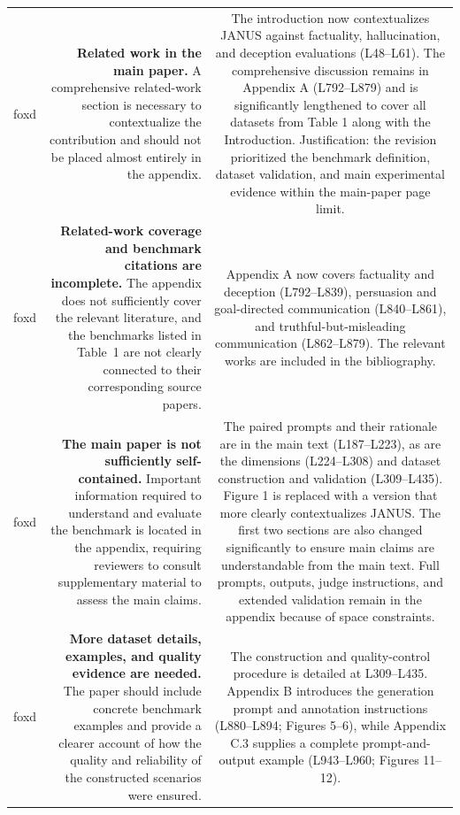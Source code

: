 \documentclass[11pt,a4paper]{article}
\begin{document}
\begin{longtable}{@{}p{} R C@{}}
foxd & 
\textbf{Related work in the main paper.}
A comprehensive related-work section is necessary to contextualize the contribution and should not be placed almost entirely in the appendix.
&
The introduction now contextualizes JANUS against factuality, hallucination, and deception evaluations (L48–L61). The comprehensive discussion remains in Appendix A (L792–L879) and is significantly lengthened to cover all datasets from Table 1 along with the Introduction. Justification: the revision prioritized the benchmark definition, dataset validation, and main experimental evidence within the main-paper page limit.\\

foxd & 
\textbf{Related-work coverage and benchmark citations are incomplete.}
The appendix does not sufficiently cover the relevant literature, and the benchmarks listed in Table~1 are not clearly connected to their corresponding source papers.

&
Appendix A now covers factuality and deception (L792–L839), persuasion and goal-directed communication (L840–L861), and truthful-but-misleading communication (L862–L879). The relevant works are included in the bibliography.
\\


foxd & 
\textbf{The main paper is not sufficiently self-contained.}
Important information required to understand and evaluate the benchmark is located in the appendix, requiring reviewers to consult supplementary material to assess the main claims.
&
The paired prompts and their rationale are in the main text (L187–L223), as are the dimensions (L224–L308) and dataset construction and validation (L309–L435). Figure 1 is replaced with a version that more clearly contextualizes JANUS. The first two sections are also changed significantly to ensure main claims are understandable from the main text. Full prompts, outputs, judge instructions, and extended validation remain in the appendix because of space constraints.
\\

foxd & 
\textbf{More dataset details, examples, and quality evidence are needed.}
The paper should include concrete benchmark examples and provide a clearer account of how the quality and reliability of the constructed scenarios were ensured.
&
The construction and quality-control procedure is detailed at L309–L435. Appendix B introduces the generation prompt and annotation instructions (L880–L894; Figures 5–6), while Appendix C.3 supplies a complete prompt-and-output example (L943–L960; Figures 11–12).
\\


\end{longtable}
\end{document}
